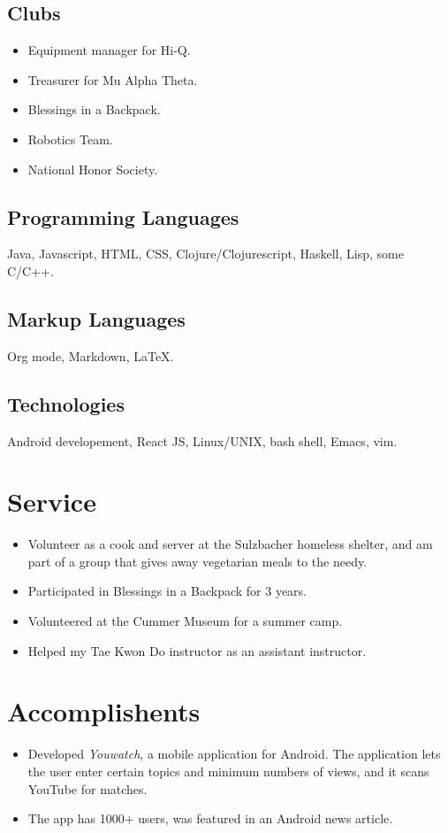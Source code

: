 \documentclass[12pt]{article}
\begin{document}
\subsection{Clubs}
\begin{itemize}
\item Equipment manager for Hi-Q.
\item Treasurer for Mu Alpha Theta.
\item Blessings in a Backpack.
\item Robotics Team.
\item National Honor Society. 
\end{itemize}

\subsection{Programming Languages}
Java, Javascript, HTML, CSS, Clojure/Clojurescript, Haskell, Lisp, some C/C++.

\subsection{Markup Languages}
Org mode, Markdown, \LaTeX{}.

\subsection{Technologies}
Android developement, React JS, Linux/UNIX, bash shell, Emacs, vim. 

\section{Service}
\begin{itemize}
\item Volunteer as a cook and server at the Sulzbacher homeless shelter, and am
  part of a group that gives away vegetarian meals to the needy.
\item Participated in Blessings in a Backpack for 3 years.
\item Volunteered at the Cummer Museum for a summer camp.
\item Helped my Tae Kwon Do instructor as an assistant instructor.
\end{itemize}

\section{Accomplishents}
\begin{itemize}
\item Developed \textit{Youwatch}, a mobile application for Android. The
  application lets the user enter certain topics and minimum numbers of views,
  and it scans YouTube for matches.
\item The app has 1000+ users, was featured in an Android news article. 
\end{itemize}
\end{document}
